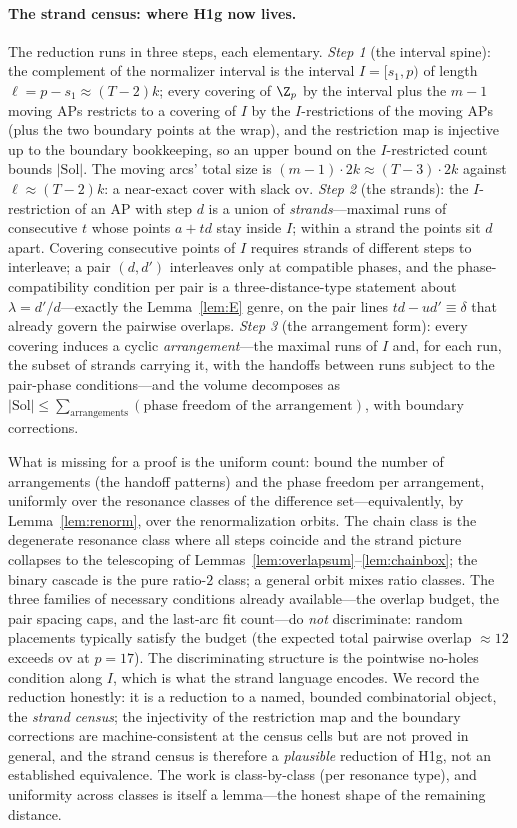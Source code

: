 \paragraph{The strand census: where H1g now lives.}
The reduction runs in three steps, each elementary. \emph{Step 1}
(the interval spine): the complement of the normalizer interval is the
interval $I=[s_1,p)$ of length $\ell=p-s_1\approx(T-2)k$; every
covering of $\Z_p$ by the interval plus the $m-1$ moving APs restricts
to a covering of $I$ by the $I$-restrictions of the moving APs (plus
the two boundary points at the wrap), and the restriction map is
injective up to the boundary bookkeeping, so an upper bound on the
$I$-restricted count bounds $|\mathrm{Sol}|$. The moving arcs' total
size is $(m-1)\cdot2k\approx(T-3)\cdot2k$ against
$\ell\approx(T-2)k$: a near-exact cover with slack $\mathrm{ov}$.
\emph{Step 2} (the strands): the $I$-restriction of an AP with step
$d$ is a union of \emph{strands}---maximal runs of consecutive $t$
whose points $a+td$ stay inside $I$; within a strand the points sit $d$
apart. Covering consecutive points of $I$ requires strands of
different steps to interleave; a pair $(d,d')$ interleaves only at
compatible phases, and the phase-compatibility condition per pair is
a three-distance-type statement about $\lambda=d'/d$---exactly the
Lemma~\ref{lem:E} genre, on the pair lines $td-ud'\equiv\delta$ that
already govern the pairwise overlaps. \emph{Step 3} (the arrangement
form): every covering induces a cyclic \emph{arrangement}---the
maximal runs of $I$ and, for each run, the subset of strands carrying
it, with the handoffs between runs subject to the pair-phase
conditions---and the volume decomposes as
$|\mathrm{Sol}|\le\sum_{\text{arrangements}}(\text{phase freedom of
the arrangement})$, with boundary corrections.

What is missing for a proof is the uniform count: bound the number of
arrangements (the handoff patterns) and the phase freedom per
arrangement, uniformly over the resonance classes of the difference
set---equivalently, by Lemma~\ref{lem:renorm}, over the
renormalization orbits. The chain class is the degenerate resonance
class where all steps coincide and the strand picture collapses to the
telescoping of Lemmas~\ref{lem:overlapsum}--\ref{lem:chainbox}; the
binary cascade is the pure ratio-$2$ class; a general orbit mixes
ratio classes. The three families of necessary conditions already
available---the overlap budget, the pair spacing caps, and the
last-arc fit count---do \emph{not} discriminate: random placements
typically satisfy the budget (the expected total pairwise overlap
$\approx12$ exceeds $\mathrm{ov}$ at $p=17$). The discriminating
structure is the pointwise no-holes condition along $I$, which is what
the strand language encodes. We record the reduction honestly: it is a
reduction to a named, bounded combinatorial object, the \emph{strand
census}; the injectivity of the restriction map and the boundary
corrections are machine-consistent at the census cells but are not
proved in general, and the strand census is therefore a
\emph{plausible} reduction of H1g, not an established equivalence. The
work is class-by-class (per resonance type), and uniformity across
classes is itself a lemma---the honest shape of the remaining distance.

